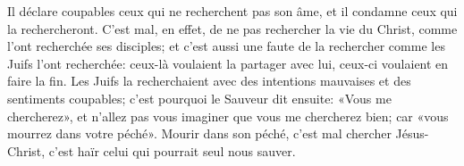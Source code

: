 Il déclare coupables ceux qui ne recherchent pas son âme,
	et il condamne ceux qui la rechercheront.
C’est mal, en effet, de ne pas rechercher la vie du Christ,
		comme l’ont recherchée ses disciples;
	et c’est aussi une faute de la rechercher comme les Juifs l’ont recherchée:
	ceux-là voulaient la partager avec lui, ceux-ci voulaient en faire la fin.
Les Juifs la recherchaient avec des intentions mauvaises et des sentiments coupables;
	c’est pourquoi le Sauveur dit ensuite: «Vous me chercherez»,
	et n’allez pas vous imaginer que vous me chercherez bien;
	car «vous mourrez dans votre péché».
Mourir dans son péché, c’est mal chercher Jésus-Christ,
	c’est haïr celui qui pourrait seul nous sauver.
